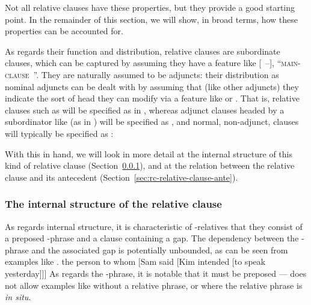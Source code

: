 \documentclass[output=paper
 	        ,biblatex
                ,babelshorthands
                ,newtxmath
                ,draftmode
                ,colorlinks, citecolor=brown
]{langscibook}
\begin{document}
Not all relative clauses have these properties, but they provide a good starting point.
In the remainder of this section, we will show, in broad terms, how these properties can
be accounted for.

As regards their function and distribution, relative clauses are subordinate clauses,
which can be captured by assuming they have a  feature like [~{--}],
``\textsc{main-clause}~''. They are naturally assumed to be adjuncts: their
distribution as nominal adjuncts can be dealt with by assuming that (like other adjuncts)
they indicate the sort of head they can modify via a feature like  or
. %
That is,
relative clauses such as  will be specified as in , whereas
adjunct clauses headed by a subordinator like  (as in ) will be specified as , and normal, non-adjunct, clauses will
typically be specified as :
\begin{exe}\ex\begin{xlist}
  \ex\label{x:rc-5}
  \ex\label{x:rc-6}
 \ex\label{x:rc-7}
\end{xlist}
\end{exe}

With this in hand, we will look in more detail at the internal structure of this kind of
relative clause (Section~\ref{sec:rc-intern-struct-relat}), and at the relation between
the relative clause and its antecedent (Section~\ref{sec:rc-relative-clause-ante}).

\subsubsection{The internal structure of the relative clause}
\label{sec:rc-intern-struct-relat}\label{rc:sec-internal-structure}

As regards internal structure, it is characteristic of -relatives that
they consist of a preposed -phrase and a clause containing a gap.
The dependency between the -phrase and the associated gap is potentially
unbounded, as can be seen from examples like .
\ea
\label{x:rc-11}
the person to whom [Sam said [Kim intended [to speak \trace yesterday]]]
\z
As regards the -phrase, it is notable that it must be preposed --- 
does not allow examples like  without a relative phrase, or  where
the relative phrase is \emph{in situ}.
\end{document}
